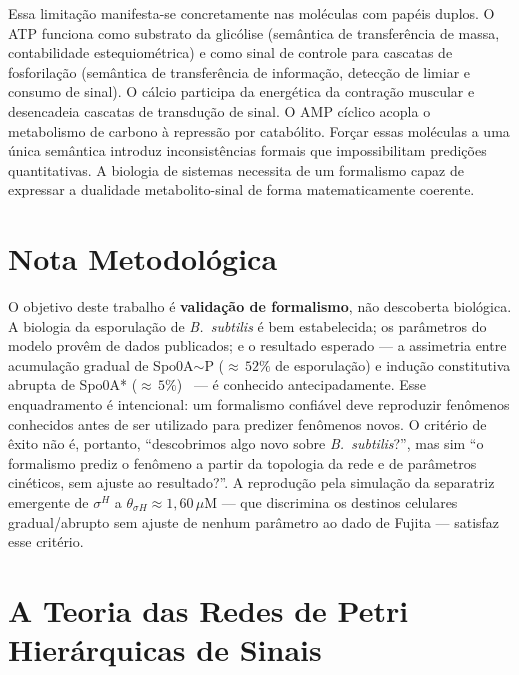 Essa limitação manifesta-se concretamente nas moléculas com papéis duplos.
O ATP funciona como substrato da glicólise (semântica de transferência de massa,
contabilidade estequiométrica) e como sinal de controle para cascatas de
fosforilação (semântica de transferência de informação, detecção de limiar e
consumo de sinal). O cálcio participa da energética da contração muscular e
desencadeia cascatas de transdução de sinal. O AMP cíclico acopla o metabolismo
de carbono à repressão por catabólito. Forçar essas moléculas a uma única
semântica introduz inconsistências formais que impossibilitam predições
quantitativas. A biologia de sistemas necessita de um formalismo capaz de
expressar a dualidade metabolito-sinal de forma matematicamente coerente.

\section{Nota Metodológica}
\label{sec:nota-metodologica}

O objetivo deste trabalho é \textbf{validação de formalismo}, não descoberta
biológica. A biologia da esporulação de \textit{B.~subtilis} é bem estabelecida;
os parâmetros do modelo provêm de dados publicados; e o resultado esperado ---
a assimetria entre acumulação gradual de Spo0A${\sim}$P
(${\approx}\,52\%$ de esporulação) e indução constitutiva abrupta de Spo0A*
(${\approx}\,5\%$)~\cite{Fujita2005} --- é conhecido antecipadamente.
Esse enquadramento é intencional: um formalismo confiável deve reproduzir
fenômenos conhecidos antes de ser utilizado para predizer fenômenos novos. O
critério de êxito não é, portanto, ``descobrimos algo novo sobre
\textit{B.~subtilis}?'', mas sim ``o formalismo prediz o fenômeno a partir da
topologia da rede e de parâmetros cinéticos, sem ajuste ao resultado?''. A reprodução pela simulação
da separatriz emergente de $\sigma^H$ a $\theta_{\sigma H} \approx 1{,}60\,\mu$M
--- que discrimina os destinos celulares gradual/abrupto sem ajuste de
nenhum parâmetro ao dado de Fujita --- satisfaz esse critério.

\section{A Teoria das Redes de Petri Hierárquicas de Sinais}
\label{sec:teoria-shpn}

